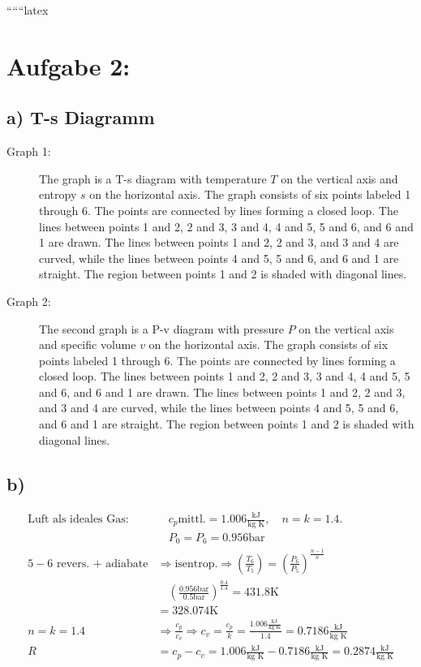 
``````latex


\section*{Aufgabe 2:}

\subsection*{a) T-s Diagramm}

\begin{description}
    \item[Graph 1:] The graph is a T-s diagram with temperature \( T \) on the vertical axis and entropy \( s \) on the horizontal axis. The graph consists of six points labeled 1 through 6. The points are connected by lines forming a closed loop. The lines between points 1 and 2, 2 and 3, 3 and 4, 4 and 5, 5 and 6, and 6 and 1 are drawn. The lines between points 1 and 2, 2 and 3, and 3 and 4 are curved, while the lines between points 4 and 5, 5 and 6, and 6 and 1 are straight. The region between points 1 and 2 is shaded with diagonal lines.
    \item[Graph 2:] The second graph is a P-v diagram with pressure \( P \) on the vertical axis and specific volume \( v \) on the horizontal axis. The graph consists of six points labeled 1 through 6. The points are connected by lines forming a closed loop. The lines between points 1 and 2, 2 and 3, 3 and 4, 4 and 5, 5 and 6, and 6 and 1 are drawn. The lines between points 1 and 2, 2 and 3, and 3 and 4 are curved, while the lines between points 4 and 5, 5 and 6, and 6 and 1 are straight. The region between points 1 and 2 is shaded with diagonal lines.
\end{description}

\subsection*{b)}

\begin{align*}
    \text{Luft als ideales Gas:} & \quad c_p \text{mittl.} = 1.006 \frac{\text{kJ}}{\text{kg K}}, \quad n = k = 1.4. \\
    & \quad P_0 = P_6 = 0.956 \text{bar} \\
    5-6 \text{ revers. + adiabate} & \Rightarrow \text{isentrop.} \Rightarrow \left( \frac{T_6}{T_5} \right) = \left( \frac{P_6}{P_5} \right)^{\frac{n-1}{n}} \\
    & \quad \left( \frac{0.956 \text{bar}}{0.5 \text{bar}} \right)^{\frac{0.4}{1.4}} = 431.8 \text{K} \\
    & = 328.074 \text{K} \\
    n = k = 1.4 & \Rightarrow \frac{c_p}{c_v} \Rightarrow c_v = \frac{c_p}{k} = \frac{1.006 \frac{\text{kJ}}{\text{kg K}}}{1.4} = 0.7186 \frac{\text{kJ}}{\text{kg K}} \\
    R & = c_p - c_v = 1.006 \frac{\text{kJ}}{\text{kg K}} - 0.7186 \frac{\text{kJ}}{\text{kg K}} = 0.2874 \frac{\text{kJ}}{\text{kg K}}
\end{align*}

